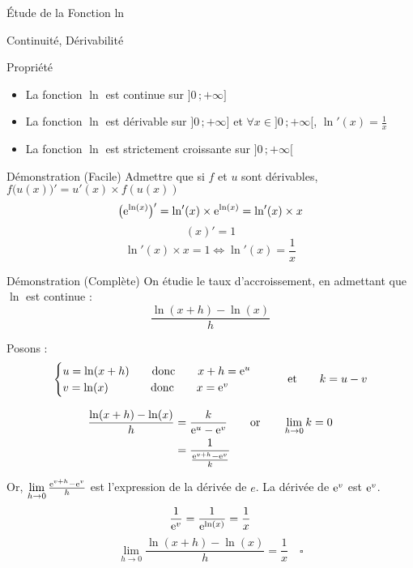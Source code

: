 \documentclass{cours}
\begin{document}
    \begin{Gpartie}{Étude de la Fonction ln}
        \begin{Spartie}{Continuité, Dérivabilité}
            \begin{SSpartie}{Propriété}
                \begin{itemize}
                    \item La fonction $\ln$ est continue sur $\big]0\,;+\infty\big]$
                    \item La fonction $\ln$ est dérivable sur $\big]0\,;+\infty\big]$ et $\forall x\in\big]0\,;+\infty\big[$, $\ln'(x)=\frac{1}{x}$
                    \item La fonction $\ln$ est strictement croissante sur $\big]0\,;+\infty\big[$
                \end{itemize}
                \begin{SSSpartie}{Démonstration (Facile)}
                    Admettre que si $f$ et $u$ sont dérivables, $f\big(u(x)\big)'=u'(x)\times f(u(x))$
                    \[\big(\mathrm{e}^{\ln(x)}\big)'=\ln'(x)\times \mathrm{e}^{\ln(x)}=\ln'(x)\times x\]
                    \[(x)'=1\]
                    \[\ln'(x)\times x=1\iff\ln'(x)=\frac{1}{x}\]
                    
                \end{SSSpartie}
                \begin{SSSpartie}{Démonstration (Complète)} 
                    On étudie le taux d'accroissement, en admettant que $\ln$ est continue :
                    \[\frac{\ln(x+h)-\ln(x)}{h}\]

                    Posons :
                    \[\begin{cases}
                        u=\ln(x+h)\qquad\text{donc}\qquad x+h=\mathrm{e}^u \\ v=\ln(x)\phantom{+h)}\text{\qquad donc\qquad} x=\mathrm{e}^v
                    \end{cases}\qquad\text{et}\qquad k=u-v\]

                    \[\begin{aligned}[t]
                        \frac{\ln(x+h)-\ln(x)}{h}&=\frac{k}{\mathrm{e}^u-\mathrm{e}^v}\qquad\text{or}\qquad\lim_{h\to0}k=0 \\
                        &=\frac{1}{\frac{\mathrm{e}^{v+h}-\mathrm{e}^v}{k}}
                    \end{aligned}\]

                    Or, $\lim\limits_{h\to0}\frac{\mathrm{e}^{v+h}-\mathrm{e}^v}{h}$ est l'expression de la dérivée de $e$. La dérivée de $\mathrm{e}^v$ est $\mathrm{e}^v$.
                    \[\frac{1}{\mathrm{e}^v}=\frac{1}{\mathrm{e}^{\ln(x)}}=\frac{1}{x}\]
                    \[\lim\limits_{h\to 0}\frac{\ln(x+h)-\ln(x)}{h}=\frac{1}{x}\quad\square\]


\end{SSSpartie}
\end{SSpartie}
\end{Spartie}
\end{Gpartie}
\end{document}
